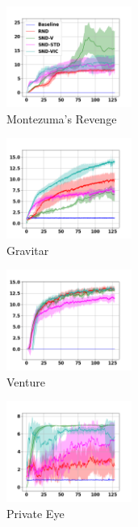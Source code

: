 \documentclass[a4paper,11pt]{elsarticle}
\begin{document}
\begin{figure}[t!]
  \centering
  \begin{subfigure}[b]{0.32\textwidth}
    \centering
    \includegraphics[width=4.1cm]{fig/results/montezuma.png}
    \caption{Montezuma's Revenge}
    \label{fig:res2a}
  \end{subfigure}
  \begin{subfigure}[b]{0.32\textwidth}
    \centering
    \includegraphics[width=4.1cm]{fig/results/gravitar.png}
    \caption{Gravitar}
    \label{fig:res2b}
  \end{subfigure}  
  \begin{subfigure}[b]{0.32\textwidth}
    \centering
    \includegraphics[width=4.1cm]{fig/results/venture.png}
    \caption{Venture}
    \label{fig:res2c}
  \end{subfigure}
  \begin{subfigure}[b]{0.32\textwidth}
    \centering
    \includegraphics[width=4.1cm]{fig/results/private_eye.png}
    \caption{Private Eye}
    \label{fig:res2d}
  \end{subfigure} 
  \begin{subfigure}[b]{0.32\textwidth}

\end{subfigure}
\end{figure}
\end{document}
